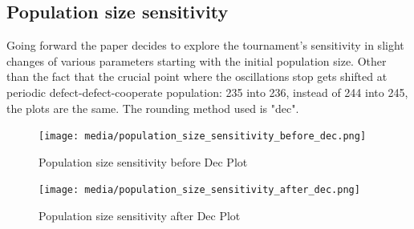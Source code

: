 \documentclass[12pt]{article}
\begin{document}
\subsection{Population size sensitivity}
Going forward the paper decides to explore the tournament's sensitivity in slight changes of various parameters starting with the initial population size. Other than the fact that the crucial point where the oscillations stop gets shifted at periodic defect-defect-cooperate population: 235 into 236, instead of 244 into 245, the plots are the same. The rounding method used is "dec".

\begin{figure}[H]
    \centering
    \texttt{[image: media/population\_size\_sensitivity\_before\_dec.png]}
    \caption{Population size sensitivity before Dec Plot}
\end{figure}

\begin{figure}[H]
    \centering
    \texttt{[image: media/population\_size\_sensitivity\_after\_dec.png]}
    \caption{Population size sensitivity after Dec Plot}
\end{figure}
\end{document}
